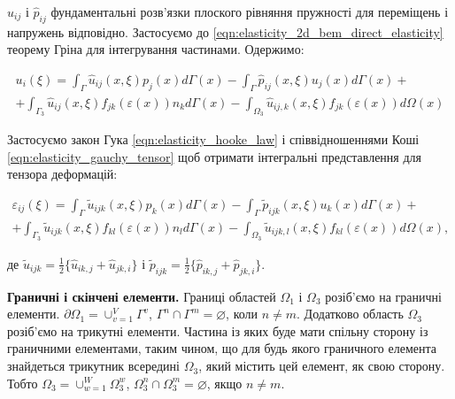 \noindent$\hat{u}_{ij}$ і $\hat{p}_{ij}$ фундаментальні розв'язки плоского рівняння пружності для переміщень і напружень 
відповідно. Застосуємо до \ref{eqn:elasticity_2d_bem_direct_elasticity} теорему Гріна для інтегрування частинами. 
Одержимо:

\begin{equation}
    \label{eqn:elasticity_2d_bem_direct_elasticity_simplified}
    \begin{split}
    u_i(\xi) = \int_{\Gamma}\hat{u}_{ij}(x,\xi)p_j(x)d\Gamma(x) - \int_{\Gamma}\hat{p}_{ij}(x,\xi)u_j(x)d\Gamma(x) + \\ 
        + \int_{\Gamma_3} \hat{u}_{ij}(x,\xi)f_{jk}(\varepsilon(x))n_kd\Gamma(x)
        - \int_{\Omega_3} \hat{u}_{ij,k}(x,\xi)f_{jk}(\varepsilon(x))d\Omega(x)
    \end{split}
\end{equation}

Застосуємо закон Гука \ref{eqn:elasticity_hooke_law} і співвідношеннями Коші \ref{eqn:elasticity_gauchy_tensor} щоб 
отримати інтегральні представлення для тензора деформацій:

\begin{equation}
    \label{eqn:elasticity_2d_bem_direct_gauchy_tensor}
    \begin{split}
    \varepsilon_{ij}(\xi) = \int_{\Gamma}\tilde{u}_{ijk}(x,\xi)p_k(x)d\Gamma(x) 
        - \int_{\Gamma}\tilde{p}_{ijk}(x,\xi)u_k(x)d\Gamma(x) + \\ 
        + \int_{\Gamma_3} \tilde{u}_{ijk}(x,\xi)f_{kl}(\varepsilon(x))n_l d\Gamma(x)
        - \int_{\Omega_3} \tilde{u}_{ijk,l}(x,\xi)f_{kl}(\varepsilon(x))d\Omega(x),
    \end{split}
\end{equation}

\noindent де $\tilde{u}_{ijk} = \frac{1}{2} \{ \hat{u}_{ik,j} + \hat{u}_{jk,i} \} $ і 
$\tilde{p}_{ijk} = \frac{1}{2} \{ \hat{p}_{ik,j} + \hat{p}_{jk,i} \}$.

\textbf{Граничні і скінчені елементи.} Границі областей $\Omega_1$ і $\Omega_3$ розіб'ємо на граничні елементи. 
$\partial\Omega_1 = \cup_{v=1}^{V}\Gamma^v$, $\Gamma^n \cap \Gamma^m = \varnothing$, коли $n \neq m$. 
Додатково область $\Omega_3$ розіб'ємо на трикутні елементи. Частина із яких буде мати спільну сторону із 
граничними елементами, таким чином, що для будь якого граничного елемента знайдеться трикутник всередині $\Omega_3$, 
який містить цей елемент, як свою сторону. Тобто $\Omega_3 = \cup_{w=1}^{W} \Omega_3^w$, 
$\Omega_3^n \cap \Omega_3^m = \varnothing$, якщо $n \neq m$. 

